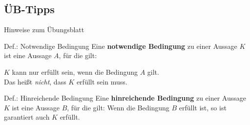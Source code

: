 \subsection{ÜB-Tipps}
\begin{frame}{Hinweise zum Übungsblatt}
	\begin{block}{Def.: Notwendige Bedingung}
		Eine \textbf{notwendige Bedingung} zu einer Aussage $K$ ist eine Aussage $A$, für die gilt:

		{\center $K$ kann nur erfüllt sein, wenn die Bedingung $A$ gilt.\\}
		Das heißt \textit{nicht}, dass $K$ erfüllt sein muss.
	\end{block}

	\begin{block}{Def.: Hinreichende Bedingung}
		Eine \textbf{hinreichende Bedingung} zu einer Aussage $K$ ist eine Aussage $B$, für die gilt:
		\center Wenn die Bedingung $B$ erfüllt ist, so ist garantiert auch $K$ erfüllt.
	\end{block}
\end{frame}